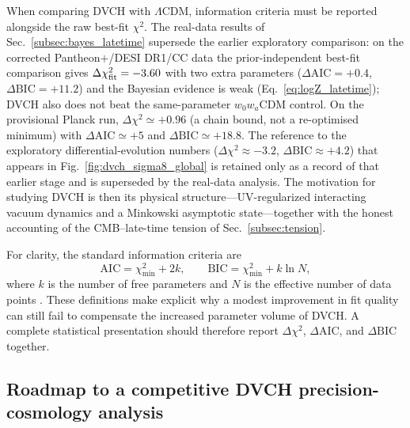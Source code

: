 \documentclass[pdflatex,sn-mathphys-num]{sn-jnl}%
\begin{document}
When comparing DVCH with $\Lambda$CDM, information criteria must be reported
alongside the raw best-fit $\chi^2$. The real-data results of
Sec.~\ref{subsec:bayes_latetime} supersede the earlier exploratory
comparison: on the corrected Pantheon$+$/DESI DR1/CC data the
prior-independent best-fit comparison gives
$\Delta\chi^2_{\rm fit}=-3.60$ with two extra parameters
($\Delta\mathrm{AIC}=+0.4$, $\Delta\mathrm{BIC}=+11.2$) and the Bayesian
evidence is weak (Eq.~\ref{eq:logZ_latetime}); DVCH also does not beat the
same-parameter $w_0w_a$CDM control. On the provisional Planck run,
$\Delta\chi^2\simeq+0.96$ (a chain bound, not a re-optimised minimum) with
$\Delta\mathrm{AIC}\simeq+5$ and $\Delta\mathrm{BIC}\simeq+18.8$. The
reference to the exploratory differential-evolution numbers
($\Delta\chi^2\approx-3.2$, $\Delta\mathrm{BIC}\approx+4.2$) that appears in
Fig.~\ref{fig:dvch_sigma8_global} is retained only as a record of that earlier
stage and is superseded by the real-data analysis. The motivation for studying
DVCH is then its physical structure---UV-regularized interacting vacuum
dynamics and a Minkowski asymptotic state---together with the honest accounting of the
CMB--late-time tension of Sec.~\ref{subsec:tension}.

For clarity, the standard information criteria are
\begin{equation}
\mathrm{AIC}=\chi^2_{\min}+2k,
\qquad
\mathrm{BIC}=\chi^2_{\min}+k\ln N,
\end{equation}
where $k$ is the number of free parameters and $N$ is the effective number of
data points \cite{Akaike:1974,Schwarz:1978}. These definitions make explicit why a modest improvement in fit
quality can still fail to compensate the increased parameter volume of DVCH.
A complete statistical presentation should therefore report
$\Delta\chi^2$, $\Delta\mathrm{AIC}$, and $\Delta\mathrm{BIC}$ together.

\subsection{Roadmap to a competitive DVCH precision-cosmology analysis}
\label{subsec:dvch_precision_roadmap}
\end{document}
